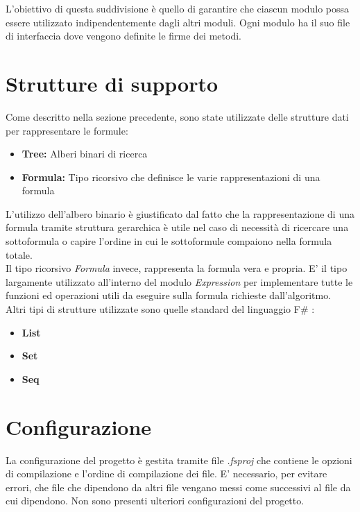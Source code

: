 \documentclass[\main/tesi.tex]{subfiles}
\begin{document}
L'obiettivo di questa suddivisione è quello di garantire che ciascun modulo possa essere utilizzato indipendentemente dagli altri moduli.
Ogni modulo ha il suo file di interfaccia dove vengono definite le firme dei metodi.

\section{Strutture di supporto}
Come descritto nella sezione precedente, sono state utilizzate delle strutture dati per rappresentare le formule:
\begin{itemize}
    \item \textbf{Tree:} Alberi binari di ricerca
    \item \textbf{Formula:} Tipo ricorsivo che definisce le varie rappresentazioni di una formula
\end{itemize}
L'utilizzo dell'albero binario è giustificato dal fatto che la rappresentazione di una formula tramite struttura gerarchica è utile nel caso di necessità di ricercare una sottoformula o capire l'ordine in cui le sottoformule compaiono nella formula totale. \\
Il tipo ricorsivo \textit{Formula} invece, rappresenta la formula vera e propria. E' il tipo largamente utilizzato all'interno del modulo \textit{Expression} per implementare tutte le funzioni ed operazioni utili da eseguire sulla formula richieste dall'algoritmo. \\
Altri tipi di strutture utilizzate sono quelle standard del linguaggio F\# \cite{fsharp}:
\begin{itemize}
    \item \textbf{List}
    \item \textbf{Set}
    \item \textbf{Seq}
\end{itemize}

\section{Configurazione}
La configurazione del progetto è gestita tramite file \textit{.fsproj} che contiene le opzioni di compilazione e l'ordine di compilazione dei file. E' necessario, per evitare errori, che file che dipendono da altri file vengano messi come successivi al file da cui dipendono.
Non sono presenti ulteriori configurazioni del progetto.

\newpage
\end{document}
